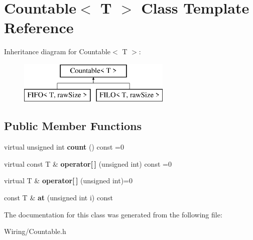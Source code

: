 \hypertarget{class_countable}{}\section{Countable$<$ T $>$ Class Template Reference}
\label{class_countable}
Inheritance diagram for Countable$<$ T $>$\+:\begin{figure}[H]
\begin{center}
\leavevmode
\includegraphics[height=2.000000cm]{class_countable}
\end{center}
\end{figure}
\subsection*{Public Member Functions}
\begin{DoxyCompactItemize}
\item 
\hypertarget{class_countable_a8112c5c4a8de941c8d2dc783fbfe3c7a}{}virtual unsigned int {\bfseries count} () const =0\label{class_countable_a8112c5c4a8de941c8d2dc783fbfe3c7a}

\item 
\hypertarget{class_countable_a86379f5661b5ad88f68c22010c3e6c69}{}virtual const T \& {\bfseries operator\mbox{[}$\,$\mbox{]}} (unsigned int) const =0\label{class_countable_a86379f5661b5ad88f68c22010c3e6c69}

\item 
\hypertarget{class_countable_a9d81652b06fe7bfd6a29e8bde8088d7f}{}virtual T \& {\bfseries operator\mbox{[}$\,$\mbox{]}} (unsigned int)=0\label{class_countable_a9d81652b06fe7bfd6a29e8bde8088d7f}

\item 
\hypertarget{class_countable_a34441ee721d3accbb7169dc04aadaa5f}{}const T \& {\bfseries at} (unsigned int i) const \label{class_countable_a34441ee721d3accbb7169dc04aadaa5f}

\end{DoxyCompactItemize}


The documentation for this class was generated from the following file\+:\begin{DoxyCompactItemize}
\item 
Wiring/Countable.\+h\end{DoxyCompactItemize}
